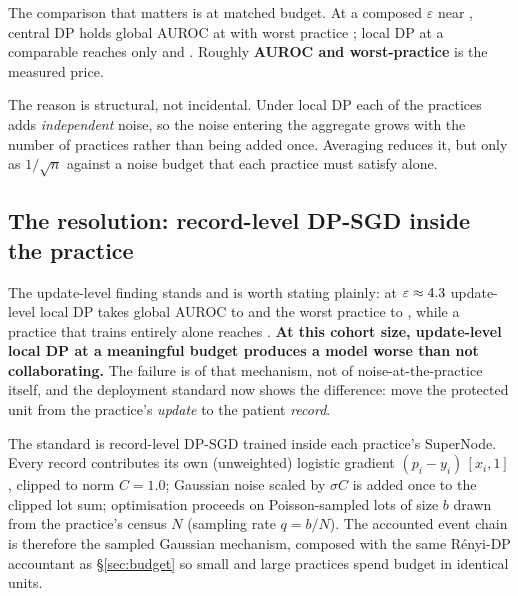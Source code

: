 The comparison that matters is at matched budget. At a composed $\varepsilon$ near
\EpsAtSigmaOne{}, central DP holds global AUROC at \AUCAtSigmaOne{} with worst practice
\WorstAtSigmaOne{}; local DP at a comparable \LocalEpsFive{} reaches only \LocalAUCFive{} and
\LocalWorstFive{}. Roughly \textbf{\LocalVsCentralAUCGap{} AUROC and \LocalVsCentralWorstGap{} worst-practice}
is the measured price.

The reason is structural, not incidental. Under local DP each of the \NumPractices{} practices adds
\emph{independent} noise, so the noise entering the aggregate grows with the number of practices
rather than being added once. Averaging reduces it, but only as $1/\sqrt{n}$ against a noise budget
that each practice must satisfy alone.

\subsection{The resolution: record-level DP-SGD inside the practice}

The update-level finding stands and is worth stating plainly: at $\varepsilon \approx 4.3{}$
update-level local DP takes global AUROC to \LocalAUCOne{} and the worst practice to
\LocalWorstOne{}, while a practice that trains entirely alone reaches \LocalWorst{}. \textbf{At
this cohort size, update-level local DP at a meaningful budget produces a model worse than not
collaborating.} The failure is of that mechanism, not of noise-at-the-practice itself, and the
deployment standard now shows the difference: move the protected unit from the practice's
\emph{update} to the patient \emph{record}.

The standard is record-level DP-SGD \cite{abadi2016dpsgd} trained inside each practice's SuperNode.
Every record contributes its own (unweighted)
logistic gradient $(p_i - y_i)\,[x_i, 1]$, clipped to norm $C = 1.0$; Gaussian
noise scaled by $\sigma C$ is added once to the clipped lot sum; optimisation proceeds on
Poisson-sampled lots of size $b$ drawn from the practice's census $N$ (sampling rate $q = b/N$).
The accounted event chain is therefore the sampled Gaussian mechanism, composed with the same
R\'enyi-DP accountant as \S\ref{sec:budget} \cite{mironov2017rdp,dpaccounting} so small and
large practices spend budget in identical units.

